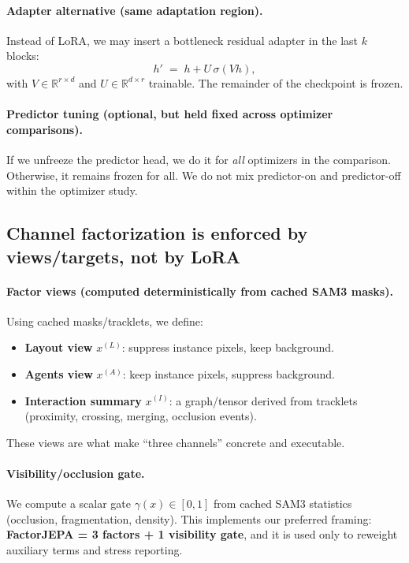 \paragraph{Adapter alternative (same adaptation region).}
Instead of LoRA, we may insert a bottleneck residual adapter in the last $k$ blocks:
\[
h' \;=\; h + U\,\sigma(Vh),
\]
with $V\in\mathbb{R}^{r\times d}$ and $U\in\mathbb{R}^{d\times r}$ trainable. The remainder of the checkpoint is frozen.

\paragraph{Predictor tuning (optional, but held fixed across optimizer comparisons).}
If we unfreeze the predictor head, we do it for \emph{all} optimizers in the comparison. Otherwise, it remains frozen for all. We do not mix predictor-on and predictor-off within the optimizer study.

\subsection{Channel factorization is enforced by views/targets, not by LoRA}
\label{sec:factor_channels_enforced}

\paragraph{Factor views (computed deterministically from cached SAM3 masks).}
Using cached masks/tracklets, we define:
\begin{itemize}[leftmargin=*,itemsep=2pt]
\item \textbf{Layout view} $x^{(L)}$: suppress instance pixels, keep background.
\item \textbf{Agents view} $x^{(A)}$: keep instance pixels, suppress background.
\item \textbf{Interaction summary} $x^{(I)}$: a graph/tensor derived from tracklets (proximity, crossing, merging, occlusion events).
\end{itemize}
These views are what make ``three channels'' concrete and executable.

\paragraph{Visibility/occlusion gate.}
We compute a scalar gate $\gamma(x)\in[0,1]$ from cached SAM3 statistics (occlusion, fragmentation, density). This implements our preferred framing: \textbf{FactorJEPA = 3 factors + 1 visibility gate}, and it is used only to reweight auxiliary terms and stress reporting.

